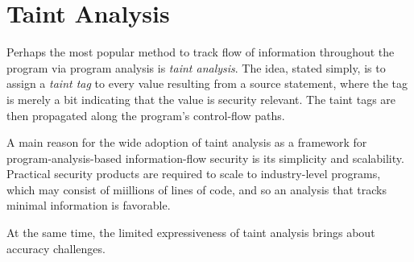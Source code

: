 \section{Taint Analysis}

Perhaps the most popular method to track flow of information throughout the program via program analysis is \emph{taint analysis}. The idea, stated simply, is to assign a \emph{taint tag} to every value resulting from a source statement, where the tag is merely a bit indicating that the value is security relevant. The taint tags are then propagated along the program's control-flow paths.

A main reason for the wide adoption of taint analysis as a framework for program-analysis-based information-flow security is its simplicity and scalability. Practical security products are required to scale to industry-level programs, which may consist of miillions of lines of code, and so an analysis that tracks minimal information is favorable.

At the same time, the limited expressiveness of taint analysis brings about accuracy challenges. 